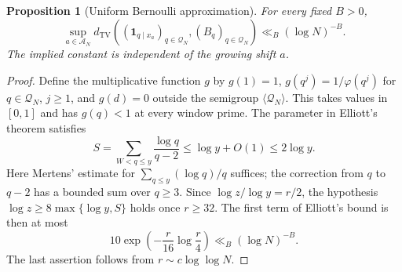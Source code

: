 \documentclass[11pt]{article}
\newtheorem{proposition}[theorem]{Proposition}
\theoremstyle{remark}\newtheorem{remark}[theorem]{Remark}
\newcommand{\one}{\mathbf 1}
\begin{document}
\begin{proposition}[Uniform Bernoulli approximation]\label{prop:elliott-uniform}
For every fixed $B>0$,
\begin{equation}\label{eq:elliott-tv}
 \sup_{a\in\mathcal A_N}
 d_{\mathrm{TV}}\!\left(
   (\one_{q\mid x_a})_{q\in\mathcal Q_N},
   (B_q)_{q\in\mathcal Q_N}\right)
 \ll_B(\log N)^{-B}.
\end{equation}
The implied constant is independent of the growing shift $a$.
\end{proposition}
\begin{proof}
Define the multiplicative function $g$ by $g(1)=1$,
$g(q^j)=1/\varphi(q^j)$ for $q\in\mathcal Q_N$, $j\ge1$, and
$g(d)=0$ outside the semigroup $\langle\mathcal Q_N\rangle$.
This takes values in $[0,1]$ and has $g(q)<1$ at every window prime.
The parameter in Elliott's theorem satisfies
\[
 S=\sum_{W<q\le y}\frac{\log q}{q-2}
 \le\log y+O(1)\le2\log y.
\]
Here Mertens' estimate for $\sum_{q\le y}(\log q)/q$ suffices;
the correction from $q$ to $q-2$ has a bounded sum over $q\ge3$.
Since $\log z/\log y=r/2$, the hypothesis
$\log z\ge8\max\{\log y,S\}$ holds once $r\ge32$.
The first term of Elliott's bound is then at most
\begin{equation}\label{eq:elliott-exponential}
 10\exp\!\left(-\frac r{16}\log\frac r4\right)
 \ll_B(\log N)^{-B}.
\end{equation}
The last assertion follows from $r\sim c\log\log N$.


\end{proof}
\end{document}
